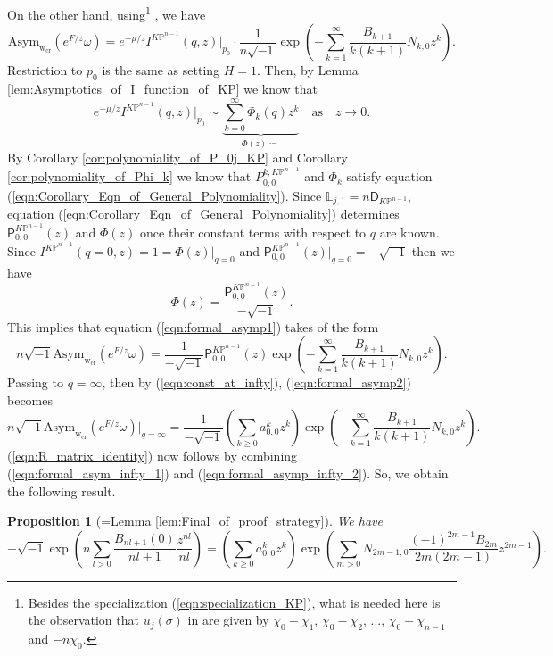 \documentclass[12pt]{amsart}
\newtheorem{prop}{Proposition}[section]
\numberwithin{equation}{section}
\newcommand{\KP}{K\mathbb{P}}
\begin{document}
On the other hand, using\footnote{Besides the specialization (\ref{eqn:specialization_KP}), what is needed here is the observation that $u_j(\sigma)$ in \cite[Proposition 6.9]{ccit_toric3} are given by $\chi_0-\chi_1$, $\chi_0-\chi_2$, ..., $\chi_0-\chi_{n-1}$ and $-n\chi_0$.} \cite[Proposition 6.9]{ccit_toric3}, we have 
\begin{equation}\label{eqn:formal_asymp1}
\text{Asym}_{\mathrm{w}_{\text{cr}}}(e^{F/z}\omega)=e^{-\mu/z}I^{\KP^{n-1}}(q,z)\big|_{p_0}   \cdot \frac{1}{n\sqrt{-1}}\exp\left(-\sum_{k=1}^\infty \frac{B_{k+1}}{k(k+1)}N_{k,0}z^k \right).
\end{equation}
Restriction to $p_0$ is the same as setting $H=1$. Then, by Lemma \ref{lem:Asymptotics_of_I_function_of_KP} we know that
\begin{equation}
e^{-\mu/z}I^{\KP^{n-1}}(q,z)\big|_{p_0}\sim \underbrace{\sum_{k=0}^{\infty} \Phi_{k}(q) {z}^k}_{\Phi(z) \coloneqq } \quad \text{as} \quad {z} \rightarrow 0.
\end{equation}
By Corollary \ref{cor:polynomiality_of_P_0j_KP} and Corollary \ref{cor:polynomiality_of_Phi_k} we know that $P_{0,0}^{k,\KP^{n-1}}$ and $\Phi_k$ satisfy equation (\ref{eqn:Corollary_Eqn_of_General_Polynomiality}). Since $\mathds{L}_{j,1}=n\mathsf{D}_{\KP^{n-1}}$, equation (\ref{eqn:Corollary_Eqn_of_General_Polynomiality}) determines $\mathsf{P}_{0,0}^{\KP^{n-1}}(z)$ and $\Phi(z)$ once their constant terms with respect to $q$ are known. Since $I^{\KP^{n-1}}(q=0,z)=1=\Phi(z)\vert_{q=0}$ and $\mathsf{P}_{0,0}^{\KP^{n-1}}(z)\vert_{q=0}=-\sqrt{-1}$ then we have
\begin{equation*}
\Phi(z)=\frac{\mathsf{P}_{0,0}^{\KP^{n-1}}(z)}{-\sqrt{-1}}.
\end{equation*}
This implies that equation (\ref{eqn:formal_asymp1}) takes of the form
\begin{equation}\label{eqn:formal_asymp2}
n\sqrt{-1} \text{Asym}_{\mathrm{w}_{\text{cr}}}(e^{F/z}\omega)=\frac{1}{-\sqrt{-1}}{\mathsf{P}}_{0,0}^{\KP^{n-1}}(z)\exp\left(-\sum_{k=1}^\infty \frac{B_{k+1}}{k(k+1)}N_{k,0}z^k \right).  
\end{equation}
Passing to $q=\infty$, then by (\ref{eqn:const_at_infty}), (\ref{eqn:formal_asymp2}) becomes
\begin{equation}\label{eqn:formal_asymp_infty_2}
n\sqrt{-1} \text{Asym}_{\mathrm{w}_{\text{cr}}}(e^{F/z}\omega)|_{q=\infty}=\frac{1}{-\sqrt{-1}}\left(\sum_{k\geq{0}}a_{0,0}^kz^k \right)\exp\left(-\sum_{k=1}^\infty \frac{B_{k+1}}{k(k+1)}N_{k,0}z^k \right).      
\end{equation}
(\ref{eqn:R_matrix_identity}) now follows by combining (\ref{eqn:formal_asym_infty_1}) and (\ref{eqn:formal_asymp_infty_2}). So, we obtain the following result.
\begin{prop}[=Lemma \ref{lem:Final_of_proof_strategy}]
We have \begin{equation}
-\sqrt{-1}\exp\left(n\sum_{l>0}\frac{B_{nl+1}\left(0\right)}{nl+1}\frac{z^{nl}}{nl} \right)
=\left(\sum_{k\geq{0}}a_{0,0}^kz^k\right)\exp\left(\sum_{m>0}N_{2m-1, 0}\frac{(-1)^{2m-1}B_{2m}}{2m(2m-1)}z^{2m-1}\right).
\end{equation}
\end{prop}
\end{document}
